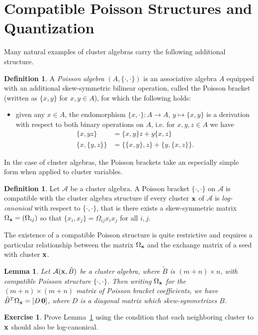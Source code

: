 \documentclass{amsart}
\newtheorem{lemma}[theorem]{Lemma}
\theoremstyle{definition}
\newtheorem{definition}[theorem]{Definition}
\newtheorem{subexercise}{Exercise}[theorem]
\theoremstyle{remark}
\numberwithin{equation}{section}
\newcommand{\cA}{{\mathcal{A}}}
\newcommand{\bx}{{\bf x}}
\begin{document}
\section{Compatible Poisson Structures and Quantization}\label{sec:poisson_and_quantum}

  Many natural examples of cluster algebras carry the following additional structure. 
  \begin{definition}
    A \emph{Poisson algebra} $(A,\{\cdot,\cdot\})$ is an associative algebra $A$ equipped with an additional skew-symmetric bilinear operation, called the Poisson bracket (written as $\{x,y\}$ for $x,y\in A$), for which the following holds:
    \begin{itemize}
      \item given any $x\in A$, the endomorphism $\{x,\cdot\}:A\to A$, $y\mapsto\{x,y\}$ is a derivation with respect to both binary operations on $A$, i.e. for $x,y,z\in A$ we have
      \begin{align*}
        \tag{Leibnitz rule} \{x,yz\}&=\{x,y\}z+y\{x,z\}\\
        \tag{Jacobi identity}\{x,\{y,z\}\}&=\{\{x,y\},z\}+\{y,\{x,z\}\}.
      \end{align*}
    \end{itemize}
  \end{definition}

  In the case of cluster algebras, the Poisson brackets take an especially simple form when applied to cluster variables.  
  \begin{definition}
    Let $\cA$ be a cluster algebra.  A Poisson bracket $\{\cdot,\cdot\}$ on $\cA$ is compatible with the cluster algebra structure if every cluster $\bx$ of $\cA$ is \emph{log-canonical} with respect to $\{\cdot,\cdot\}$, that is there exists a skew-symmetric matrix $\Omega_\bx=(\Omega_{ij})$ so that $\{x_i,x_j\}=\Omega_{ij}x_ix_j$ for all $i,j$.
  \end{definition}

  The existence of a compatible Poisson structure is quite restrictive and requires a particular relationship between the matrix $\Omega_\bx$ and the exchange matrix of a seed with cluster $\bx$. 
  \begin{lemma}
  \label{le:compatibility}
    Let $\cA(\bx,\tilde B)$ be a cluster algebra, where $\tilde B$ is $(m+n)\times n$, with compatible Poisson structure $\{\cdot,\cdot\}$.  Then writing $\Omega_\bx$ for the $(m+n) \times (m+n)$ matrix of Poisson bracket coefficients, we have $\tilde B^T\Omega_\bx=[D\, \boldsymbol{0}]$, where $D$ is a diagonal matrix which skew-symmetrizes $B$.
  \end{lemma}
  \begin{subexercise}
    Prove Lemma~\ref{le:compatibility} using the condition that each neighboring cluster to $\bx$ should also be log-canonical.
  \end{subexercise}
  
\end{document}
